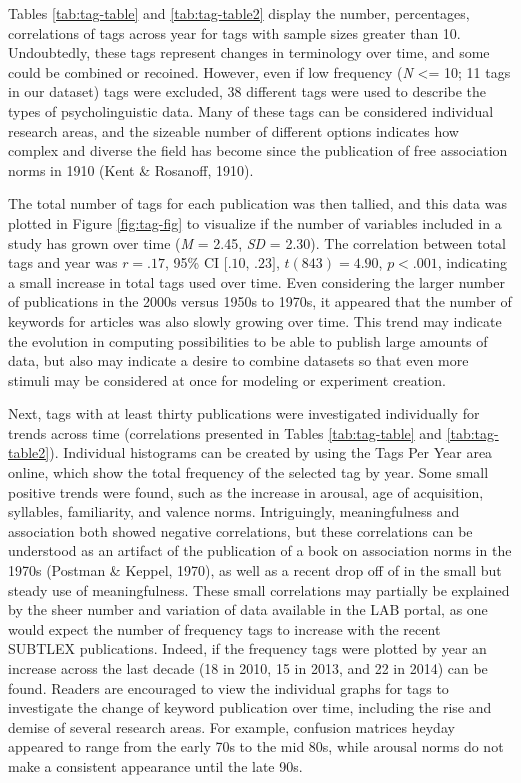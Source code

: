 \documentclass[english,,man]{apa6}
\theoremstyle{definition}
\theoremstyle{definition}
\theoremstyle{definition}
\theoremstyle{remark}
\begin{document}
Tables \ref{tab:tag-table} and \ref{tab:tag-table2} display the number,
percentages, correlations of tags across year for tags with sample sizes
greater than 10. Undoubtedly, these tags represent changes in
terminology over time, and some could be combined or recoined. However,
even if low frequency (\emph{N} \textless{}= 10; 11 tags in our dataset)
tags were excluded, 38 different tags were used to describe the types of
psycholinguistic data. Many of these tags can be considered individual
research areas, and the sizeable number of different options indicates
how complex and diverse the field has become since the publication of
free association norms in 1910 (Kent \& Rosanoff, 1910).

The total number of tags for each publication was then tallied, and this
data was plotted in Figure \ref{fig:tag-fig} to visualize if the number
of variables included in a study has grown over time (\emph{M} = 2.45,
\emph{SD} = 2.30). The correlation between total tags and year was
\(r = .17\), 95\% CI \([.10\), \(.23]\), \(t(843) = 4.90\),
\(p < .001\), indicating a small increase in total tags used over time.
Even considering the larger number of publications in the 2000s versus
1950s to 1970s, it appeared that the number of keywords for articles was
also slowly growing over time. This trend may indicate the evolution in
computing possibilities to be able to publish large amounts of data, but
also may indicate a desire to combine datasets so that even more stimuli
may be considered at once for modeling or experiment creation.

Next, tags with at least thirty publications were investigated
individually for trends across time (correlations presented in Tables
\ref{tab:tag-table} and \ref{tab:tag-table2}). Individual histograms can
be created by using the Tags Per Year area online, which show the total
frequency of the selected tag by year. Some small positive trends were
found, such as the increase in arousal, age of acquisition, syllables,
familiarity, and valence norms. Intriguingly, meaningfulness and
association both showed negative correlations, but these correlations
can be understood as an artifact of the publication of a book on
association norms in the 1970s (Postman \& Keppel, 1970), as well as a
recent drop off of in the small but steady use of meaningfulness. These
small correlations may partially be explained by the sheer number and
variation of data available in the LAB portal, as one would expect the
number of frequency tags to increase with the recent SUBTLEX
publications. Indeed, if the frequency tags were plotted by year an
increase across the last decade (18 in 2010, 15 in 2013, and 22 in 2014)
can be found. Readers are encouraged to view the individual graphs for
tags to investigate the change of keyword publication over time,
including the rise and demise of several research areas. For example,
confusion matrices heyday appeared to range from the early 70s to the
mid 80s, while arousal norms do not make a consistent appearance until
the late 90s.
\end{document}
